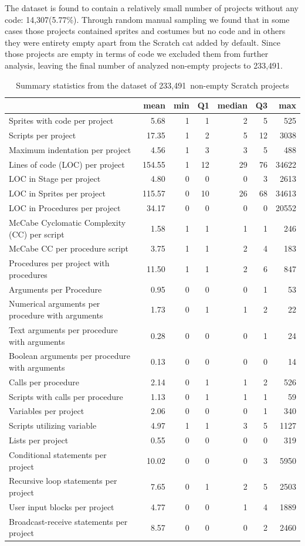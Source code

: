 \documentclass{sig-alternate}
\newcommand{\nemptyPrograms}{14,307}
\newcommand{\nScriptPrograms}{233,491}
\begin{document}
The dataset is found to contain a relatively small number of projects without any code: \nemptyPrograms (5.77\%). Through random manual sampling we found that in some cases those projects contained sprites and costumes but no code and in others they were entirety empty apart from the Scratch cat added by default. Since those projects are empty in terms of code we excluded them from further analysis, leaving the final number of analyzed non-empty projects to \nScriptPrograms.

\begin{table}[ht]
	\centering
	\begin{tabular}{lrrrrrr}
		\hline
		&\textbf{mean}&\textbf{min}&\textbf{Q1}&\textbf{median}&\textbf{Q3}&\textbf{max}\\
		\hline
		Sprites with code per project&5.68&1&1&2&5&525\\
		Scripts per project&17.35&1&2&5&12&3038\\
		Maximum indentation per project&4.56&1&3&3&5&488\\
		Lines of code (LOC) per project&154.55&1&12&29&76&34622\\
		LOC in Stage per project&4.80&0&0&0&3&2613\\
		LOC in Sprites per project&115.57&0&10&26&68&34613\\
		LOC in Procedures per project&34.17&0&0&0&0&20552\\
		McCabe Cyclomatic Complexity (CC) per script&1.58&1&1&1&1&246\\
		McCabe CC per procedure script&3.75&1&1&2&4&183\\
		Procedures per project with procedures&11.50&1&1&2&6&847\\
		Arguments per Procedure&0.95&0&0&0&1&53\\
		Numerical arguments per procedure with arguments&1.73&0&1&1&2&22\\
		Text arguments per procedure with arguments&0.28&0&0&0&1&24\\
		Boolean arguments per procedure with arguments&0.13&0&0&0&0&14\\
		Calls per procedure&2.14&0&1&1&2&526\\
		Scripts with calls per procedure&1.13&0&1&1&1&59\\
		Variables per project&2.06&0&0&0&1&340\\
		Scripts utilizing variable&4.97&1&1&3&5&1127\\
		Lists per project&0.55&0&0&0&0&319\\
		Conditional statements per project&10.02&0&0&0&3&5950\\
		Recursive loop statements per project&7.65&0&1&2&5&2503\\
		User input blocks per project&4.77&0&0&1&4&1889\\
		Broadcast-receive statements per project&8.57&0&0&0&2&2460\\	
		\hline
	\end{tabular}
	\caption{Summary statistics from the dataset of \nScriptPrograms~non-empty Scratch projects}
	\label{tbl-size}
\end{table}
\end{document}
